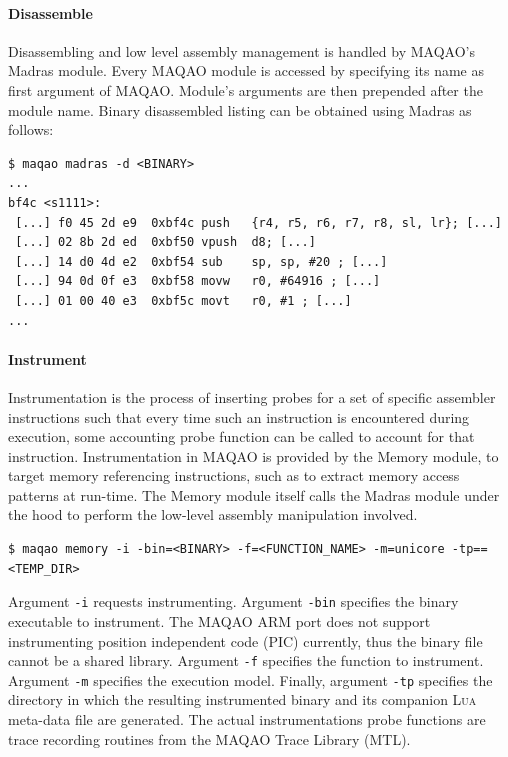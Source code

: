 \documentclass[11pt, a4paper, twoside]{montblanc2}
\def\lua{\textsc{Lua}\xspace}
\begin{document}
\paragraph{Disassemble}

Disassembling and low level assembly management is handled by MAQAO's Madras module. Every MAQAO 
module is accessed by specifying its name as first argument of MAQAO. Module's arguments are then 
prepended after the module name. Binary disassembled listing can be obtained using Madras as 
follows:

\begin{verbatim}
$ maqao madras -d <BINARY>
...
bf4c <s1111>:
 [...] f0 45 2d e9  0xbf4c push   {r4, r5, r6, r7, r8, sl, lr}; [...]
 [...] 02 8b 2d ed  0xbf50 vpush  d8; [...]
 [...] 14 d0 4d e2  0xbf54 sub    sp, sp, #20 ; [...]
 [...] 94 0d 0f e3  0xbf58 movw   r0, #64916 ; [...]
 [...] 01 00 40 e3  0xbf5c movt   r0, #1 ; [...]
...
\end{verbatim}

\paragraph{Instrument}

Instrumentation is the process of inserting probes for a set of specific
assembler instructions such that every time such an instruction is encountered
during execution, some accounting probe function can be called to account for
that instruction. Instrumentation in MAQAO is provided by the Memory module,
to target memory referencing instructions, such as to extract memory access
patterns at run-time. The Memory module itself calls the Madras module under the
hood to perform the low-level assembly manipulation involved.

\begin{verbatim}
$ maqao memory -i -bin=<BINARY> -f=<FUNCTION_NAME> -m=unicore -tp==<TEMP_DIR>
\end{verbatim}

Argument \verb|-i| requests instrumenting. Argument \verb|-bin| specifies the
binary executable to instrument. The MAQAO ARM port does not support
instrumenting position independent code (PIC) currently, thus the binary file
cannot be a shared library. Argument \verb|-f| specifies the function to
instrument. Argument \verb|-m| specifies the execution model. Finally, argument
\verb|-tp| specifies the directory in which the resulting instrumented binary
and its companion \lua meta-data file are generated. The actual instrumentations 
probe functions are trace recording routines from the MAQAO Trace Library (MTL).
\end{document}

